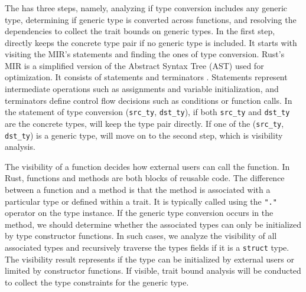 \subsubsection{\Analysisone} \label{tyconvanalysis}
%
The \analysisone has three steps,
{namely, analyzing if type conversion includes any generic type, determining if generic type is converted across functions, and resolving the dependencies to collect the trait bounds on generic types}.
In the first step, \tyanalyzer directly keeps the concrete type pair if no generic type is included.
It starts with visiting the MIR's statements \cite{statement} and finding the ones of type conversion.
%
Rust's MIR is a simplified version of the Abstract Syntax Tree (AST) used for optimization.
It consists of statements and terminators \cite{terminator}. Statements represent intermediate operations such as assignments and variable initialization, and terminators define control flow decisions such as conditions or function calls.
%
In the statement of type conversion (\texttt{src\_ty}, \texttt{dst\_ty}), 
if both \texttt{src\_ty} and \texttt{dst\_ty} are the concrete types, \tyanalyzer will keep the type pair directly.
%
If one of the (\texttt{src\_ty}, \texttt{dst\_ty}) is a generic type, \tyanalyzer will move on to the second step, which is visibility analysis.


\vspace{0.05in}
{
The visibility of a function decides how external users can call the function.
%
In Rust, functions and methods are both blocks of reusable code.
The difference between a function and a method is that the method is associated with a particular type or defined within a trait.
%
It is typically called using the \texttt{"."} operator on the type instance.
%
If the generic type conversion occurs in the method, we should determine whether the associated types can only be initialized by type constructor functions.
In such cases, we analyze the visibility of all associated types and recursively traverse the types fields if it is a \texttt{struct} type.
%
The visibility result represents if the type can be initialized by external users or limited by constructor functions.
%
If visible, trait bound analysis will be conducted to collect the type constraints for the generic type.
}

